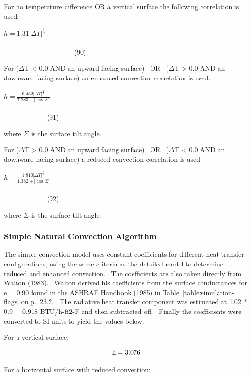 For no temperature difference OR a vertical surface the following correlation is used:

\(h = 1.31{\left| {\Delta T} \right|^{\frac{1}{3}}}\) ~~~~~~~~~~~~~~~~~~~~~~~~~~~~~~~~~~~~~~~~~~~~~~~~~~~~~~~~~~~~~~~~~~~~~~~~~~~~~~~~~~~~~~~~~~~~ (90)

For ($\Delta$T \textless{} 0.0 AND an upward facing surface)~ OR~ ($\Delta$T \textgreater{} 0.0 AND an downward facing surface) an enhanced convection correlation is used:

\(h = \frac{{9.482{{\left| {\Delta T} \right|}^{\frac{1}{3}}}}}{{7.283 - \left| {\cos \Sigma } \right|}}\) ~~~~~~~~~~~~~~~~~~~~~~~~~~~~~~~~~~~~~~~~~~~~~~~~~~~~~~~~~~~~~~~~~~~~~~~~~~~~~~~~~~~~ (91)

where $\Sigma$ is the surface tilt angle.

For ($\Delta$T \textgreater{} 0.0 AND an upward facing surface)~ OR~ ($\Delta$T \textless{} 0.0 AND an downward facing surface) a reduced convection correlation is used:

\(h = \frac{{1.810{{\left| {\Delta T} \right|}^{\frac{1}{3}}}}}{{1.382 + \left| {\cos \Sigma } \right|}}\) ~~~~~~~~~~~~~~~~~~~~~~~~~~~~~~~~~~~~~~~~~~~~~~~~~~~~~~~~~~~~~~~~~~~~~~~~~~~~~~~~~~~~ (92)

where $\Sigma$ is the surface tilt angle.

\subsubsection{Simple Natural Convection Algorithm}\label{simple-natural-convection-algorithm}

The simple convection model uses constant coefficients for different heat transfer configurations, using the same criteria as the detailed model to determine reduced and enhanced convection.~ The coefficients are also taken directly from Walton (1983).~ Walton derived his coefficients from the surface conductances for e = 0.90 found in the ASHRAE Handbook (1985) in Table~\ref{table:simulation-flags} on p.~23.2.~ The radiative heat transfer component was estimated at 1.02 * 0.9 = 0.918 BTU/h-ft2-F and then subtracted off.~ Finally the coefficients were converted to SI units to yield the values below.

For a vertical surface:

\begin{equation}
{\rm{h  =  3}}{\rm{.076}}
\end{equation}

For a horizontal surface with reduced convection:

